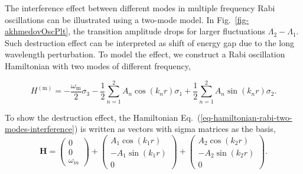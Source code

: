 \documentclass[%
reprint,
 amsmath,amssymb,
 aps,
]{revtex4-1}
\begin{document}


The interference effect between different modes in multiple frequency Rabi oscillations can be illustrated using a two-mode model. In Fig.~\ref{fig-akhmedovOscPlt}, the transition amplitude drops for larger fluctuations $\Lambda_2-\Lambda_1$. Such destruction effect can be interpreted as shift of energy gap due to the long wavelength perturbation. To model the effect, we construct a Rabi oscillation Hamiltonian with two modes of different frequency,
\begin{widetext}
\begin{equation}
H^{(\mathrm{m})}  = -\frac{\omega_{\mathrm{m}}}{2} \sigma_3 - \frac{1}{2} \sum_{n=1}^2  A_n \cos (k_n r) \sigma_1 + \frac{1}{2} \sum_{n=1}^2  A_n \sin (k_n r) \sigma_2 .
\label{eq-hamiltonian-rabi-two-modes-interference}
\end{equation}
\end{widetext}

To show the destruction effect, the Hamiltonian Eq.~(\ref{eq-hamiltonian-rabi-two-modes-interference}) is written as vectors with sigma matrices as the basis,
\begin{equation}
\mathbf H = \begin{pmatrix}
0\\
0\\
\omega_m
\end{pmatrix} + \begin{pmatrix}
A_1 \cos (k_1 r)\\
-A_1 \sin (k_1 r)\\
0
\end{pmatrix} + \begin{pmatrix}
A_2 \cos (k_2 r)\\
-A_2 \sin (k_2 r)\\
0
\end{pmatrix}.
\end{equation}
\end{document}
